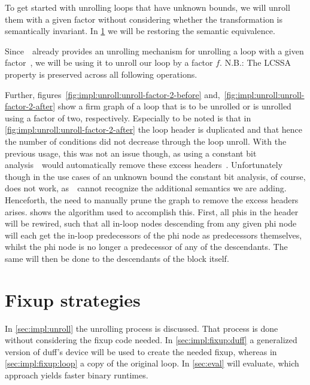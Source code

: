To get started with unrolling loops that have unknown bounds, we will unroll them with a given factor without considering whether the transformation is semantically invariant.
In \cref{sec:impl:fixup} we will be restoring the semantic equivalence.

Since~\libFIRM~already provides an unrolling mechanism for unrolling a loop with a given factor~\cite{aebi18bachelorarbeit}, we will be using it to unroll our loop by a factor $f$.
N.B.: The LCSSA property is preserved across all following operations.

Further, figures~\ref{fig:impl:unroll:unroll-factor-2-before} and,~\ref{fig:impl:unroll:unroll-factor-2-after} show a firm graph of a loop that is to be unrolled or is unrolled using a factor of two, respectively.
Especially to be noted is that in \cref{fig:impl:unroll:unroll-factor-2-after} the loop header is duplicated and that hence the number of conditions did not decrease through the loop unroll.
With the previous usage, this was not an issue though, as using a constant bit analysis~\libFIRM~would automatically remove these excess headers~\cite{aebi18bachelorarbeit}.
Unfortunately though in the use cases of an unknown bound the constant bit analysis, of course, does not work, as~\libFIRM~cannot recognize the additional semantics we are adding.
Henceforth, the need to manually prune the graph to remove the excess headers arises.
 shows the algorithm used to accomplish this.
First, all phis in the header will be rewired, such that all in-loop nodes descending from any given phi node will each get the in-loop predecessors of the phi node as predecessors themselves, whilst the phi node is no longer a predecessor of any of the descendants.
The same will then be done to the descendants of the block itself.







\section{Fixup strategies}\label{sec:impl:fixup}

In \cref{sec:impl:unroll} the unrolling process is discussed.
That process is done without considering the fixup code needed.
In \cref{sec:impl:fixup:duff} a generalized version of duff's device will be used to create the needed fixup, whereas in \cref{sec:impl:fixup:loop} a copy of the original loop.
In \cref{sec:eval} will evaluate, which approach yields faster binary runtimes.

